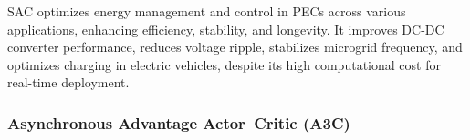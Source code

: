 


SAC optimizes energy management and control in PECs across various applications, enhancing efficiency, stability, and longevity. It improves DC-DC converter performance, reduces voltage ripple, stabilizes microgrid frequency, and optimizes charging in electric vehicles, despite its high computational cost for real-time deployment.

\subsubsection{Asynchronous Advantage Actor–Critic (A3C)}

